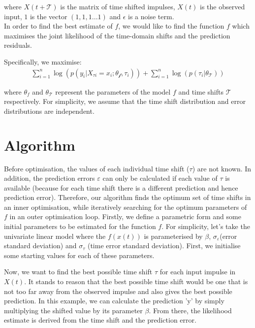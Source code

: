 \documentclass[11pt]{amsart}
\begin{document}
where $X(t + \mathcal{T})$ is the matrix of time shifted impulses, $X(t)$ is the observed input, $1$ is the vector $(1,1,1...1)$ and $\epsilon$ is a noise term.\\

In order to find the best estimate of $f$, we would like to find the function $f$ which maximises the joint likelihood of the time-domain shifts and the prediction residuals.

Specifically, we maximise:
\begin{align}
    \sum_{i=1}^{n} \log(p(y_i | X_{\tau i} = x_i; \theta_{\mathcal{f}}, \tau_i)) + \sum_{i=1}^{n} \log(p(\tau_i| \theta_{\mathcal{T}}))
\end{align}

where $\theta_{f}$ and $\theta_{\mathcal{T}}$ represent the parameters of the model $f$ and time shifts $\mathcal{T}$ respectively. For simplicity, we assume that the time shift distribution and error distributions are independent. 

\section{Algorithm}

Before optimisation, the values of each individual time shift ($\tau$) are not known. In addition, the prediction errors $\varepsilon$ can only be calculated if each value of $\tau$ is available (because for each time shift there is a different prediction and hence prediction error). Therefore, our algorithm finds the optimum set of time shifts in an inner optimisation, while iteratively searching for the optimum parameters of $f$ in an outer optimisation loop. 
Firstly, we define a parametric form and some initial parameters to be estimated for the function $f$. For simplicity, let's take the univariate linear model where the $f(x(t))$ is parameterised by $\beta$, $\sigma_{\varepsilon}$(error standard deviation)  and $\sigma_{\tau}$ (time error standard deviation). First, we initialise some starting values for each of these parameters.

Now, we want to find the best possible time shift $\tau$ for each input impulse in $X(t)$. It stands to reason that the best possible time shift would be one that is not too far away from the observed impulse and also gives the best possible prediction. In this example, we can calculate the prediction 'y' by simply multiplying the shifted value by its parameter $\beta$. From there, the likelihood estimate is derived from the time shift and the prediction error.
\end{document}
